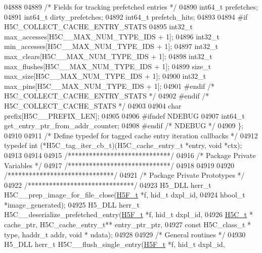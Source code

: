 \begin{DoxyCode}
04888 
04889     \textcolor{comment}{/* Fields for tracking prefetched entries */}
04890     int64\_t         prefetches;
04891     int64\_t         dirty\_prefetches;
04892     int64\_t         prefetch\_hits;
04893 
04894 \textcolor{preprocessor}{#if H5C\_COLLECT\_CACHE\_ENTRY\_STATS}
04895     int32\_t                     max\_accesses[H5C\_\_MAX\_NUM\_TYPE\_IDS + 1];
04896     int32\_t                     min\_accesses[H5C\_\_MAX\_NUM\_TYPE\_IDS + 1];
04897     int32\_t                     max\_clears[H5C\_\_MAX\_NUM\_TYPE\_IDS + 1];
04898     int32\_t                     max\_flushes[H5C\_\_MAX\_NUM\_TYPE\_IDS + 1];
04899     \textcolor{keywordtype}{size\_t}                      max\_size[H5C\_\_MAX\_NUM\_TYPE\_IDS + 1];
04900     int32\_t                     max\_pins[H5C\_\_MAX\_NUM\_TYPE\_IDS + 1];
04901 \textcolor{preprocessor}{#endif }\textcolor{comment}{/* H5C\_COLLECT\_CACHE\_ENTRY\_STATS */}\textcolor{preprocessor}{}
04902 \textcolor{preprocessor}{#endif }\textcolor{comment}{/* H5C\_COLLECT\_CACHE\_STATS */}\textcolor{preprocessor}{}
04903 
04904     \textcolor{keywordtype}{char}            prefix[H5C\_\_PREFIX\_LEN];
04905 
04906 \textcolor{preprocessor}{#ifndef NDEBUG}
04907     int64\_t                     get\_entry\_ptr\_from\_addr\_counter;
04908 \textcolor{preprocessor}{#endif }\textcolor{comment}{/* NDEBUG */}\textcolor{preprocessor}{}
04909 \};
04910 
04911 \textcolor{comment}{/* Define typedef for tagged cache entry iteration callbacks */}
04912 \textcolor{keyword}{typedef} int (*H5C\_tag\_iter\_cb\_t)(H5C\_cache\_entry\_t *entry, \textcolor{keywordtype}{void} *ctx);
04913 
04914 
04915 \textcolor{comment}{/*****************************/}
04916 \textcolor{comment}{/* Package Private Variables */}
04917 \textcolor{comment}{/*****************************/}
04918 
04919 
04920 \textcolor{comment}{/******************************/}
04921 \textcolor{comment}{/* Package Private Prototypes */}
04922 \textcolor{comment}{/******************************/}
04923 H5\_DLL herr\_t H5C\_\_prep\_image\_for\_file\_close(\hyperlink{struct_h5_f__t}{H5F\_t} *f, hid\_t dxpl\_id,
04924     hbool\_t *image\_generated);
04925 H5\_DLL herr\_t H5C\_\_deserialize\_prefetched\_entry(\hyperlink{struct_h5_f__t}{H5F\_t} *f, hid\_t dxpl\_id,
04926     \hyperlink{struct_h5_c__t}{H5C\_t} * cache\_ptr, H5C\_cache\_entry\_t** entry\_ptr\_ptr, 
04927     \textcolor{keyword}{const} H5C\_class\_t * type, haddr\_t addr, \textcolor{keywordtype}{void} * udata);
04928 
04929 \textcolor{comment}{/* General routines */}
04930 H5\_DLL herr\_t H5C\_\_flush\_single\_entry(\hyperlink{struct_h5_f__t}{H5F\_t} *f, hid\_t dxpl\_id,

\end{DoxyCode}
